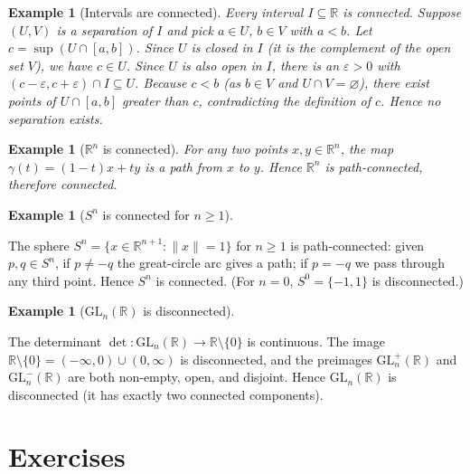 \documentclass[11pt,a4paper,twoside]{book}
\theoremstyle{remark}
\theoremstyle{definition}
\newtheorem{exampleplain}[theorem]{Example}
\theoremstyle{definition}
\newenvironment{example}[1][]{%
  \begin{exampleplain}[#1]\itshape
}{%
  \end{exampleplain}
}
\begin{document}
\begin{example}[Intervals are connected]\label{ex:intervals-connected}
Every interval $I\subseteq\mathbb{R}$ is connected.  Suppose
$(U,V)$ is a separation of $I$ and pick $a\in U$, $b\in V$ with
$a<b$.  Let $c=\sup(U\cap[a,b])$.  Since $U$ is closed in $I$
(it is the complement of the open set $V$), we have $c\in U$.
Since $U$ is also open in $I$, there is an $\varepsilon>0$ with
$(c-\varepsilon,c+\varepsilon)\cap I\subseteq U$.  Because $c<b$
(as $b\in V$ and $U\cap V=\varnothing$), there exist points of
$U\cap[a,b]$ greater than $c$, contradicting the definition of $c$.
Hence no separation exists.
\end{example}

\begin{example}[$\mathbb{R}^n$ is connected]\label{ex:Rn-connected}
For any two points $x,y\in\mathbb{R}^n$, the map
$\gamma(t)=(1-t)x+ty$ is a path from $x$ to $y$.  Hence
$\mathbb{R}^n$ is path-connected, therefore connected.
\end{example}

\begin{example}[$S^n$ is connected for $n\ge 1$]
\label{ex:sphere-connected}
The sphere $S^n=\{x\in\mathbb{R}^{n+1}:\|x\|=1\}$ for $n\ge 1$ is
path-connected: given $p,q\in S^n$, if $p\neq -q$ the great-circle
arc gives a path; if $p=-q$ we pass through any third point.  Hence
$S^n$ is connected.  (For $n=0$, $S^0=\{-1,1\}$ is disconnected.)
\end{example}

\begin{example}[$\mathrm{GL}_n(\mathbb{R})$ is disconnected]
\label{ex:GLn-disconnected}
The determinant $\det\colon\mathrm{GL}_n(\mathbb{R})\to
\mathbb{R}\setminus\{0\}$ is continuous.  The image
$\mathbb{R}\setminus\{0\}=(-\infty,0)\cup(0,\infty)$ is disconnected,
and the preimages $\mathrm{GL}_n^+(\mathbb{R})$ and
$\mathrm{GL}_n^-(\mathbb{R})$ are both non-empty, open, and disjoint.
Hence $\mathrm{GL}_n(\mathbb{R})$ is disconnected (it has exactly
two connected components).
\end{example}

\section{Exercises}
\label{sec:connected-exercises}
\end{document}
